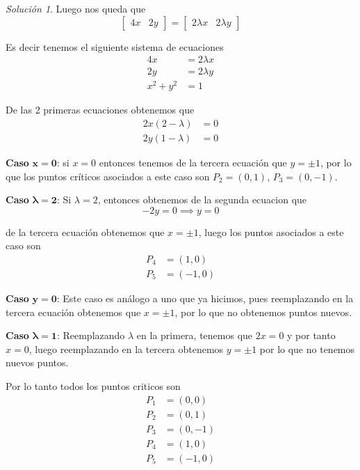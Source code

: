 \documentclass[a4paper,oneside,10.5pt]{article}
\theoremstyle{definition}
\theoremstyle{plain}
\theoremstyle{remark}
\theoremstyle{theorem}
\newtheorem{sol}{Solución}
\begin{document}
\begin{sol}
    Luego nos queda que
    \begin{equation*}
        \begin{bmatrix}
            4x & 2y
        \end{bmatrix} = \begin{bmatrix}
            2\lambda x & 2\lambda y
        \end{bmatrix}
    \end{equation*}

    Es decir tenemos el siguiente sistema de ecuaciones
    \begin{align*}
        4x &= 2\lambda x\\
        2y &= 2 \lambda y\\
        x^2 + y^2 &= 1
    \end{align*}

    De las 2 primeras ecuaciones obtenemos que
    \begin{align*}
        2x(2 - \lambda) &= 0\\
        2y(1 - \lambda) &= 0
    \end{align*}

    \textbf{Caso} $\mathbf{x = 0}$: si $x = 0$ entonces tenemos de la tercera ecuación que $y = \pm 1$, por lo que los puntos críticos asociados a este caso son $P_2 = (0, 1)$, $P_3 = (0, -1)$.

    \textbf{Caso} $\mathbf{\lambda = 2}$: Si $\lambda = 2$, entonces obtenemos de la segunda ecuacion que
    \begin{equation*}
        -2 y = 0 \implies y = 0
    \end{equation*}

    de la tercera ecuación obtenemos que $x = \pm 1$, luego los puntos asociados a este caso son
    \begin{align*}
        P_4 &= (1, 0)\\
        P_5 &= (-1, 0)
    \end{align*}

    \textbf{Caso} $\mathbf{y = 0}$: Este caso es análogo a uno que ya hicimos, pues reemplazando en la tercera ecuación obtenemos que $x = \pm1$, por lo que no obtenemos puntos nuevos.

    \textbf{Caso} $\mathbf{\lambda = 1}$: Reemplazando $\lambda$ en la primera, tenemos que $2x = 0$ y por tanto $x = 0$, luego reemplazando en la tercera obtenemos $y = \pm 1$ por lo que no tenemos nuevos puntos.

    Por lo tanto todos los puntos criticos son 
    \begin{align*}
        P_1 &= (0, 0)\\
        P_2 &= (0, 1)\\
        P_3 &= (0, -1)\\
        P_4 &= (1, 0)\\
        P_5 &= (-1, 0)
    \end{align*}


\end{sol}
\end{document}
